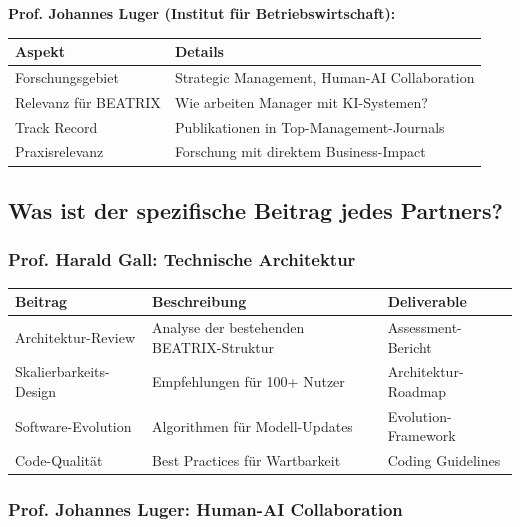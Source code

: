 \documentclass[11pt,a4paper]{article}
\begin{document}
\textbf{Prof. Johannes Luger (Institut für Betriebswirtschaft):}
\begin{table}[h]
\centering
\begin{tabularx}{\textwidth}{lX}
\toprule
\textbf{Aspekt} & \textbf{Details} \\
\midrule
Forschungsgebiet & Strategic Management, Human-AI Collaboration \\
Relevanz für BEATRIX & Wie arbeiten Manager mit KI-Systemen? \\
Track Record & Publikationen in Top-Management-Journals \\
Praxisrelevanz & Forschung mit direktem Business-Impact \\
\bottomrule
\end{tabularx}
\end{table}

\subsection{Was ist der spezifische Beitrag jedes Partners?}

\subsubsection{Prof. Harald Gall: Technische Architektur}

\begin{table}[h]
\centering
\begin{tabularx}{\textwidth}{lXl}
\toprule
\textbf{Beitrag} & \textbf{Beschreibung} & \textbf{Deliverable} \\
\midrule
Architektur-Review & Analyse der bestehenden BEATRIX-Struktur & Assessment-Bericht \\
Skalierbarkeits-Design & Empfehlungen für 100+ Nutzer & Architektur-Roadmap \\
Software-Evolution & Algorithmen für Modell-Updates & Evolution-Framework \\
Code-Qualität & Best Practices für Wartbarkeit & Coding Guidelines \\
\bottomrule
\end{tabularx}
\end{table}

\subsubsection{Prof. Johannes Luger: Human-AI Collaboration}
\end{document}
